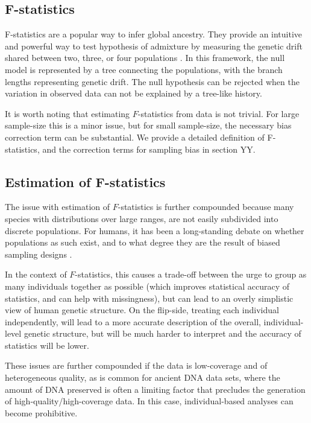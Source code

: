 \documentclass[12pt, letterpaper]{article}
\begin{document}
\subsection{F-statistics}
F-statistics are a popular way to infer global ancestry. They provide an intuitive and powerful way to test hypothesis of admixture by measuring the genetic drift shared between two, three, or four populations \cite{patterson_ancient_2012, peter_admixture_2016}. In this framework, the null model is represented by a tree connecting the populations, with the branch lengths representing genetic drift. The null hypothesis can be rejected when the variation in observed data can not be explained by a tree-like history. 

It is worth noting that estimating $F$-statistics from data is not trivial. For large sample-size this is a minor issue, but for small sample-size, the necessary bias correction term can be substantial\cite{patterson_ancient_2012}. We provide a detailed definition of F-statistics, and the correction terms for sampling bias in section YY.

\subsection{Estimation of F-statistics}
The issue with estimation of $F$-statistics is further compounded because many species with distributions over large ranges, are not easily subdivided into discrete populations. For humans, it has been a long-standing debate on whether populations as such exist, and to what degree they are the result of biased sampling designs \cite{serre_evidence_2004, rosenberg_clines_2005, peter_genetic_2020}. 

In the context of $F$-statistics, this causes a trade-off between the urge to group as many individuals together as possible (which improves statistical accuracy of statistics, and can help with missingness), but can lead to an overly simplistic view of human genetic structure. On the flip-side, treating each individual independently, will lead to a more accurate description of the overall, individual-level genetic structure, but will be much harder to interpret and the accuracy of statistics will be lower.


These issues are further compounded if the data is low-coverage and of heterogeneous quality, as is common for ancient DNA data sets, where the amount of DNA preserved is often a limiting factor that precludes the generation of high-quality/high-coverage data. In this case, individual-based analyses can become prohibitive. 
\end{document}
